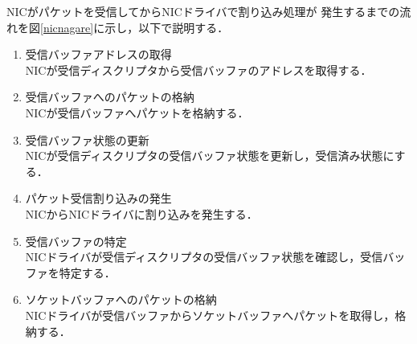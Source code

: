 \documentclass[tanilab-enum]{graduate}
\begin{document}
NICがパケットを受信してからNICドライバで割り込み処理が
発生するまでの流れを図\ref{nicnagare}に示し，以下で説明する．
\begin{enumerate}
    \item 受信バッファアドレスの取得\\
        NICが受信ディスクリプタから受信バッファのアドレスを取得する．
    \item 受信バッファへのパケットの格納\\
        NICが受信バッファへパケットを格納する．
    \item 受信バッファ状態の更新\\
        NICが受信ディスクリプタの受信バッファ状態を更新し，受信済み状態にする．
    \item パケット受信割り込みの発生\\
        NICからNICドライバに割り込みを発生する．
    \item 受信バッファの特定\\
        NICドライバが受信ディスクリプタの受信バッファ状態を確認し，受信バッファを特定する．
    \item ソケットバッファへのパケットの格納\\
        NICドライバが受信バッファからソケットバッファへパケットを取得し，格納する．
\end{enumerate}

       
\end{document}
